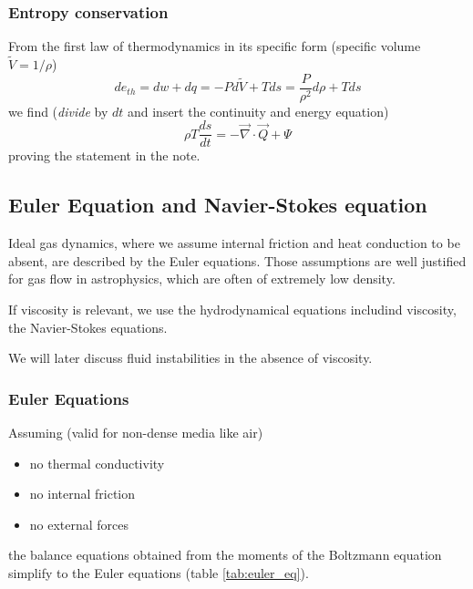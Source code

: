 \subsubsection{Entropy conservation}
From the first law of thermodynamics in its specific form (specific volume $\tilde{V} = 1/\rho$)
\begin{equation}
    de_{th} = dw + dq = -P d\tilde{V} + Tds = \frac{P}{\rho^2} d\rho + T ds
\end{equation}
we find (\textit{divide} by $dt$ and insert the continuity and energy equation)
\begin{equation}
    \rho T \frac{ds}{dt} = -\vec{\nabla} \cdot \vec{Q} + \Psi
\end{equation}
proving the statement in the note.

\subsection{Euler Equation and Navier-Stokes equation}
\textcolor{blue1}{Ideal gas dynamics}, where we assume internal friction and heat conduction to be absent,
are described by the \textcolor{blue1}{Euler equations}. Those assumptions are well justified for gas flow
in astrophysics, which are often of extremely low density.

\textcolor{blue1}{If viscosity is relevant}, we use the hydrodynamical equations includind viscosity,
the \textcolor{blue1}{Navier-Stokes equations}.

We will later discuss fluid instabilities in the absence of viscosity.

\subsubsection{Euler Equations}
Assuming (\textcolor{green1}{valid for non-dense media like air})
\begin{itemize}
    \item no thermal conductivity
    \item no internal friction
    \item no external forces
\end{itemize}
the balance equations obtained from the moments of the Boltzmann equation simplify to the Euler
equations (table \ref{tab:euler_eq}).

